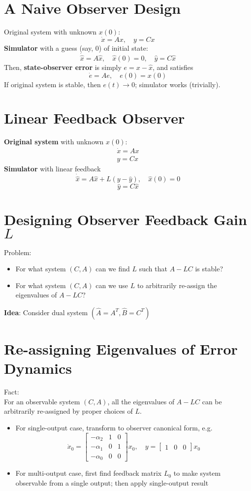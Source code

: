 \documentclass[10pt,a4paper,oneside]{article}
\begin{document}
\section{A Naive Observer Design}
Original system with unknown $x(0)$:
\[
\dot{x}=A x, \quad y=Cx
\]
{\bfseries Simulator} with a guess (say, $0$) of initial state:
\[
\dot{\hat{x}}=A \hat{x}, \quad \hat{x}(0)=0, \quad \hat{y}=C \hat{x}
\]
Then, {\bfseries state-observer error} is simply $e=x-\hat{x}$, and satisfies
\[
\dot{e}=A e, \quad e(0)=x(0)
\]
If original system is stable, then $e(t) \rightarrow 0$; simulator works (trivially).
\section{Linear Feedback Observer}
{\bfseries Original system} with unknown $x(0)$:
\[
\begin{array}{l}{\dot{x}=A x} \\ {y=C x}\end{array}
\]
{\bfseries Simulator} with linear feedback
\[
\dot{\hat{x}}=A \hat{x}+L(y-\hat{y}), \quad \hat{x}(0)=0
\]
\[
\hat{y}=C\hat{x}
\]
\section{Designing Observer Feedback Gain $L$}
Problem:
\begin{itemize}
\item For what system $(C,A)$ can we find $L$ such that $A-LC$ is stable?
\item For what system $(C,A)$ can we use $L$ to arbitrarily re-assign the eigenvalues of $A-LC$?
\end{itemize}
{\bfseries Idea}: Consider dual system $(\hat{A}=A^T, \hat{B}=C^T)$
\section{Re-assigning Eigenvalues of Error Dynamics}
Fact:\\
For an observable system $(C, A)$, all the eigenvalues of $A-LC$ can be arbitrarily re-assigned by proper choices of $L$.\\
\begin{itemize}
\item For single-output case, transform to observer canonical form, e.g.
\[
\dot{x}_{0}=\left[\begin{array}{ccc}{-\alpha_{2}} & {1} & {0} \\ {-\alpha_{1}} & {0} & {1} \\ {-\alpha_{0}} & {0} & {0}\end{array}\right] x_{0}, \quad y=\left[\begin{array}{ccc}{1} & {0} & {0}\end{array}\right] x_{0}
\]
\item For multi-output case, first find feedback matrix $L_{0}$ to make system observable from a single output; then apply single-output result
\end{itemize}
\end{document}
